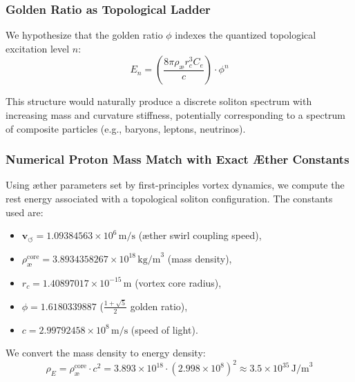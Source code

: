 \documentclass[a4paper,12pt]{article}
\begin{document}
            \subsubsection{Golden Ratio as Topological Ladder}

            We hypothesize that the golden ratio $\phi$ indexes the quantized topological excitation level $n$:
            \begin{equation}
            E_n = \left( \frac{8\pi \rho_{\text{æ}} r_c^3 C_e}{c} \right) \cdot \phi^n
            \end{equation}

            This structure would naturally produce a discrete soliton spectrum with increasing mass and curvature stiffness, potentially corresponding to a spectrum of composite particles (e.g., baryons, leptons, neutrinos).

            \subsubsection{Numerical Proton Mass Match with Exact Æther Constants}

            Using æther parameters set by first-principles vortex dynamics, we compute the rest energy associated with a topological soliton configuration. The constants used are:

            \begin{itemize}
              \item $\mathbf{v}_{\scriptscriptstyle\boldsymbol{\circlearrowleft}} = 1.09384563 \times 10^6 \, \text{m/s}$ (æther swirl coupling speed),
              \item $\rho_{\text{æ}}^{\text{core}} = 3.8934358267 \times 10^{18} \, \text{kg/m}^3$ (mass density),
              \item $r_c = 1.40897017 \times 10^{-15} \, \text{m}$ (vortex core radius),
              \item $\phi = 1.6180339887$  ($\frac{1 + \sqrt{5}}{2}$ golden ratio),
              \item $c = 2.99792458 \times 10^8 \, \text{m/s}$ (speed of light).
            \end{itemize}

            We convert the mass density to energy density:
            \begin{equation}
            \rho_E = \rho_{\text{æ}}^{\text{core}} \cdot c^2 = 3.893 \times 10^{18} \cdot (2.998 \times 10^8)^2 \approx 3.5 \times 10^{35} \, \text{J/m}^3
            \end{equation}
\end{document}
